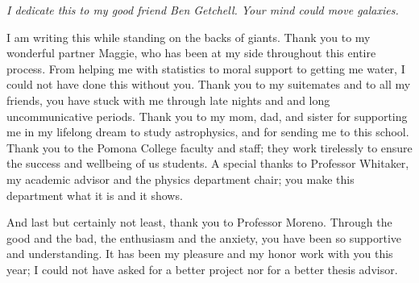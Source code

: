 
\emph{I dedicate this to my good friend Ben Getchell. Your mind could move galaxies.}

I am writing this while standing on the backs of giants. Thank you to my wonderful partner Maggie, who has been at my side throughout this entire process. From helping me with statistics to moral support to getting me water, I could not have done this without you. Thank you to my suitemates and to all my friends, you have stuck with me through late nights and and long uncommunicative periods. Thank you to my mom, dad, and sister for supporting me in my lifelong dream to study astrophysics, and for sending me to this school. Thank you to the Pomona College faculty and staff; they work tirelessly to ensure the success and wellbeing of us students. A special thanks to Professor Whitaker, my academic advisor and the physics department chair; you make this department what it is and it shows.

And last but certainly not least, thank you to Professor Moreno. Through the good and the bad, the enthusiasm and the anxiety, you have been so supportive and understanding. It has been my pleasure and my honor work with you this year; I could not have asked for a better project nor for a better thesis advisor.